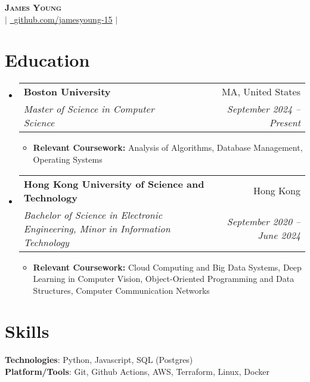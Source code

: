 \documentclass[letterpaper,11pt]{article}
\makeatletter
\newcommand{\resumeItem}[1]{
  \item\small{
    {#1 \vspace{-2pt}}
  }
}
\newcommand{\resumeSubheading}[4]{
  \vspace{-2pt}\item
    \begin{tabular*}{0.97\textwidth}[t]{l@{\extracolsep{\fill}}r}
      \textbf{#1} & #2 \\
      \textit{\small#3} & \textit{\small #4} \\
    \end{tabular*}\vspace{-7pt}
}
\newcommand{\resumeSubHeadingListStart}{\begin{itemize}[leftmargin=0.08in, label={}]}
\newcommand{\resumeSubHeadingListEnd}{\end{itemize}}
\newcommand{\resumeItemListStart}{\begin{itemize}[leftmargin=0.22in]}
\newcommand{\resumeItemListEnd}{\end{itemize}\vspace{-5pt}}
\makeatother
\begin{document}
\begin{center}
    \textbf{\Huge \scshape James Young} \\ \vspace{1pt}
    \small 
    \href{mailto:jamesyoung3931@gmail.com}{} $|$
    \href{https://github.com/jamesyoung-15} {\faGithub\ {github.com/jamesyoung-15}} $|$
    \href{https://jyyoung.com}{}
\end{center}


\section{Education}
  \resumeSubHeadingListStart
    \resumeSubheading
        {Boston University}{MA, United States}
        {Master of Science in Computer Science}{September 2024 -- Present}
        \resumeItemListStart
            \resumeItem{\textbf{Relevant Coursework:} Analysis of Algorithms, Database Management, Operating Systems}
        \resumeItemListEnd
    \resumeSubheading
        {Hong Kong University of Science and Technology}{Hong Kong}
        {Bachelor of Science in Electronic Engineering, Minor in Information Technology}{September 2020 -- June 2024}
        \resumeItemListStart
            \resumeItem{\textbf{Relevant Coursework:} Cloud Computing and Big Data Systems, Deep Learning in Computer Vision, Object-Oriented Programming and Data Structures, Computer Communication Networks}
        \resumeItemListEnd
  \resumeSubHeadingListEnd

\section{Skills}
 \begin{itemize}[leftmargin=0.08in, label={}]
    \small{\item{
     \textbf{Technologies}{: Python, Javascript, SQL (Postgres)} \\
     \textbf{Platform/Tools}{: Git, Github Actions, AWS, Terraform, Linux, Docker} \\
    }}
 \end{itemize}
\end{document}
